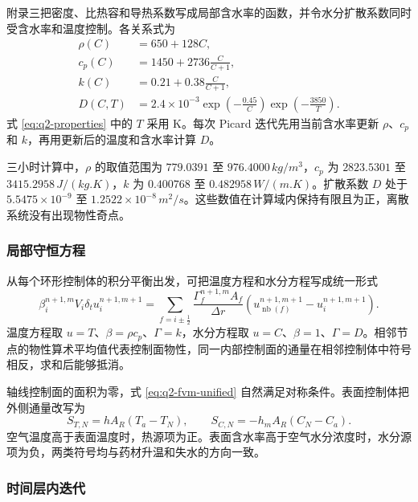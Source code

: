 \documentclass[withoutpreface,bwprint]{cumcmthesis}
\begin{document}
附录三把密度、比热容和导热系数写成局部含水率的函数，并令水分扩散系数同时受含水率和温度控制。各关系式为
\begin{align}
\rho(C)&=650+128C,\\
c_p(C)&=1450+2736\frac{C}{C+1},\\
k(C)&=0.21+0.38\frac{C}{C+1},\\
D(C,T)&=2.4\times10^{-3}
\exp\left(-\frac{0.45}{C}\right)
\exp\left(-\frac{3850}{T}\right).
\label{eq:q2-properties}
\end{align}
式 \ref{eq:q2-properties} 中的 \(T\) 采用 K。每次 Picard 迭代先用当前含水率更新 \(\rho\)、\(c_p\) 和 \(k\)，再用更新后的温度和含水率计算 \(D\)。

三小时计算中，\(\rho\) 的取值范围为 \(779.0391\) 至 \(976.4000\,\si{kg/m^3}\)，\(c_p\) 为 \(2823.5301\) 至 \(3415.2958\,\si{J/(kg.K)}\)，\(k\) 为 \(0.400768\) 至 \(0.482958\,\si{W/(m.K)}\)。扩散系数 \(D\) 处于 \(5.5475\times10^{-9}\) 至 \(1.2522\times10^{-8}\,\si{m^2/s}\)。这些数值在计算域内保持有限且为正，离散系统没有出现物性奇点。

\subsubsection{局部守恒方程}

从每个环形控制体的积分平衡出发，可把温度方程和水分方程写成统一形式
\begin{equation}
\beta_i^{n+1,m}V_i\delta_t u_i^{n+1,m+1}
=
\sum_{f=i\pm\frac{1}{2}}
\frac{\Gamma_f^{n+1,m}A_f}{\Delta r}
\left(
u_{\operatorname{nb}(f)}^{n+1,m+1}
-u_i^{n+1,m+1}
\right).
\label{eq:q2-fvm-unified}
\end{equation}
温度方程取 \(u=T\)、\(\beta=\rho c_p\)、\(\Gamma=k\)，水分方程取 \(u=C\)、\(\beta=1\)、\(\Gamma=D\)。相邻节点的物性算术平均值代表控制面物性，同一内部控制面的通量在相邻控制体中符号相反，求和后能够抵消。

轴线控制面的面积为零，式 \ref{eq:q2-fvm-unified} 自然满足对称条件。表面控制体把外侧通量改写为
\begin{equation}
S_{T,N}=hA_R\left(T_a-T_N\right),\qquad
S_{C,N}=-h_mA_R\left(C_N-C_a\right).
\label{eq:q2-surface-sources}
\end{equation}
空气温度高于表面温度时，热源项为正。表面含水率高于空气水分浓度时，水分源项为负，两类符号均与药材升温和失水的方向一致。

\subsubsection{时间层内迭代}
\end{document}
